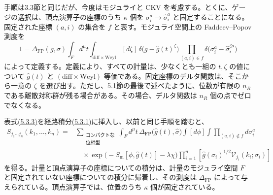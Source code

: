 手順は3.3節と同じだが、今度はモジュライと CKV を考慮する。とくに、ゲージの選択は、頂点演算子の座標のうち $\kappa$ 個を $\sigma_i^a\to\hat\sigma_i^a$ と固定することになる。固定された座標 $(a,i)$ の集合を $f$ と表す。モジュライ空間上の Faddeev--Popov 測度を
\begin{equation}
1=\Delta_{\mathrm{FP}}(g,\sigma)
\int_Fd^\mu t\int_{\mathrm{diff}\times\mathrm{Weyl}}[d\zeta]\,
\delta\bigl(g-\hat g(t)^\zeta\bigr)
\prod_{(a,i)\in f}\delta\bigl(\sigma_i^a-\hat\sigma_i^{\zeta a}\bigr)
\tag{5.3.3}\label{eq:5.3.3}
\end{equation}
によって定義する。定義により、すべての計量は、少なくとも一組の $t,\zeta$ の値について $\hat g(t)$ と $(\mathrm{diff}\times\mathrm{Weyl})$ 等価である。固定座標のデルタ関数は、そこから一意の $\zeta$ を選び出す。ただし、5.1節の最後で述べたように、位数が有限の $n_R$ である離散対称群が残る場合がある。その場合、デルタ関数は $n_R$ 個の点でゼロでなくなる。

表式\hyperref[eq:5.3.3]{(5.3.3)}を経路積分\hyperref[eq:5.3.1]{(5.3.1)}に挿入し、以前と同じ手順を踏むと、
\begin{equation}
\begin{aligned}
S_{j_1\cdots j_n}(k_1,\ldots,k_n)
={}&\sum_{\substack{\text{コンパクトな}\\\text{位相型}}}
\int_Fd^\mu t\,\Delta_{\mathrm{FP}}\bigl(\hat g(t),\hat\sigma\bigr)
\int[d\phi]\int\prod_{(a,i)\notin f}d\sigma_i^a\\
&\quad\times\exp\bigl(-S_{\mathrm m}[\phi,\hat g(t)]-\lambda\chi\bigr)
\prod_{i=1}^n\left[\hat g(\sigma_i)^{1/2}
\mathcal V_{j_i}(k_i;\sigma_i)\right]
\end{aligned}
\tag{5.3.4}\label{eq:5.3.4}
\end{equation}
を得る。計量と頂点演算子の座標についての積分は、計量のモジュライ空間 $F$ と固定されていない座標についての積分に帰着し、その測度は $\Delta_{\mathrm{FP}}$ によって与えられている。頂点演算子では、位置のうち $\kappa$ 個が固定されている。

